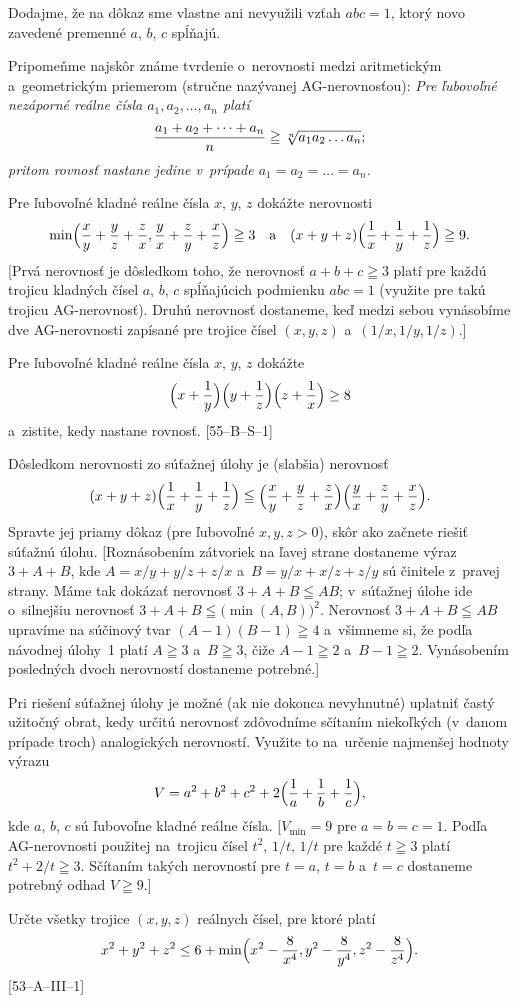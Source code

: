 {Dodajme, že na dôkaz  sme vlastne ani nevyužili vzťah
$abc=1$, ktorý novo zavedené premenné $a$, $b$, $c$ spĺňajú.

\titem
Pripomeňme najskôr známe tvrdenie o~nerovnosti medzi aritmetickým
a~geometrickým priemerom (stručne nazývanej AG-nerovnosťou):
{\sl Pre
ľubovoľné nezáporné reálne čísla $a_1,a_2,\dots,a_n$ platí
$$
\frac{a_1+a_2+\dots+a_n}{n}\geqq\root{n}\of{a_1a_2\dots a_n};
$$
pritom rovnosť nastane jedine v~prípade $a_1=a_2=\dots=a_n$.}

Pre ľubovoľné kladné reálne čísla $x$, $y$, $z$ dokážte
nerovnosti
$$
\min\Bigl(\frac{x}{y}+\frac{y}{z}+\frac{z}{x},
\frac{y}{x}+\frac{z}{y}+\frac{x}{z}\Bigr)\geqq3\quad\text{a}\quad
(x+y+z)\Bigl(\frac{1}{x}+\frac{1}{y}+\frac{1}{z}\Bigr)\geqq9.
$$
[Prvá nerovnosť je dôsledkom toho, že nerovnosť $a+b+c\geqq3$
platí pre každú trojicu kladných čísel $a$, $b$, $c$
spĺňajúcich podmienku $abc=1$ (využite pre takú trojicu AG-nerovnosť).
Druhú nerovnosť dostaneme, keď medzi sebou vynásobíme dve AG-nerovnosti zapísané pre trojice čísel $(x,y,z)$
a~$(1/x, 1/y, 1/z)$.]

Pre ľubovoľné kladné reálne čísla $x$, $y$, $z$ dokážte
$$
\Bigl(x+{1\over y}\Bigr)\Bigl(y+{1\over z}\Bigr)\Bigl(z+{1\over x}\Bigr)\ge8
$$
a~zistite, kedy nastane rovnosť. [55--B--S--1]

Dôsledkom nerovnosti zo súťažnej úlohy je (slabšia) nerovnosť
$$
(x+y+z)\Bigl(\frac{1}{x}+\frac{1}{y}+\frac{1}{z}\Bigr)\leqq
\Bigl(\frac{x}{y}+\frac{y}{z}+\frac{z}{x}\Bigr)
\Bigl(\frac{y}{x}+\frac{z}{y}+\frac{x}{z}\Bigr).
$$
Spravte jej priamy dôkaz (pre ľubovoľné $x,y,z>0$),
skôr ako začnete riešiť súťažnú úlohu.
[Roznásobením zátvoriek na ľavej strane dostaneme výraz $3+A+B$, kde
$A=x/y+y/z+z/x$ a~$B=y/x+x/z+z/y$ sú činitele z~pravej strany.
Máme tak dokázať nerovnosť $3+A+B\leqq AB$;
v~súťažnej úlohe ide o~silnejšiu nerovnosť
$3+A+B\leqq\bigl(\min(A,B)\bigr)^2$.
Nerovnosť $3+A+B\leqq AB$ upravíme na súčinový tvar
$(A-1)(B-1)\geqq4$ a~všimneme si, že podľa návodnej úlohy~1
platí $A\geqq3$ a~$B\geqq3$, čiže $A-1\geqq2$ a~$B-1\geqq2$.
Vynásobením posledných dvoch nerovností dostaneme potrebné.]

Pri riešení súťažnej úlohy je možné (ak nie dokonca nevyhnutné)
uplatniť častý užitočný obrat, kedy určitú nerovnosť zdôvodníme
sčítaním niekoľkých (v~danom prípade troch) analogických nerovností.
Využite to na~určenie najmenšej hodnoty výrazu
$$
V=a^2+b^2+c^2+2\Bigl(\frac{1}{a}+\frac{1}{b}+\frac{1}{c}\Bigr),
$$
kde $a$, $b$, $c$ sú ľubovoľne kladné reálne čísla.
[$V_{\min}=9$  pre $a=b=c=1$. Podľa AG-nerovnosti použitej na~trojicu čísel $t^2$, $1/t$, $1/t$ pre každé $t\geqq3$
platí $t^2+2/t\geqq3$. Sčítaním takých nerovností pre $t=a$, $t=b$
a~$t=c$ dostaneme potrebný odhad $V\geqq9$.]

Určte všetky trojice $(x,y,z)$ reálnych čísel, pre  ktoré platí
$$
x^2+y^2+z^2\leq 6+\min\Bigl(x^2-\frac{8}{x^4}, y^2-\frac{8}{y^4}, z^2-\frac{8}{z^4}\Bigr).
$$
[53--A--III--1]
}

